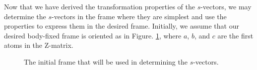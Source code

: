 \documentclass{article}
\newcommand{\fig}[1]{Figure. #1}
\begin{document}
Now that we have derived the transformation properties of the $s$-vectors, we may determine the $s$-vectors in the frame where they are simplest and use the properties to express them in the desired frame. Initially, we assume that our desired body-fixed frame is oriented as in \fig{\ref{fig:initial_frame}}, where $a$, $b$, and $c$ are the first atoms in the Z-matrix.   
\begin{figure}[htbp!]
    \centering
    \caption{The initial frame that will be used in determining the $s$-vectors.}
    \label{fig:initial_frame}
\end{figure}
\end{document}
